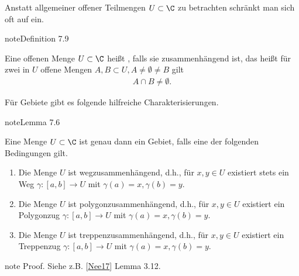 \documentclass[letterpaper,10pt,german]{jupyterBook}
\begin{document}
\sphinxAtStartPar
Anstatt allgemeiner offener Teilmengen \(U\subset\C\) zu betrachten schränkt man sich oft auf  ein.
\label{complexanalysis/kurvenintegrale:definition-13}
\begin{sphinxadmonition}{note}{Definition 7.9}



\sphinxAtStartPar
Eine offenen Menge \(U\subset\C\) heißt , falls sie zusammenhängend ist, das heißt für zwei in \(U\) offene Mengen \(A,B\subset U,A\neq\emptyset\neq B\) gilt
\begin{equation*}
\begin{split}A\cap B \neq \emptyset.\end{split}
\end{equation*}\end{sphinxadmonition}

\sphinxAtStartPar
Für Gebiete gibt es folgende hilfreiche Charakterisierungen.
\label{complexanalysis/kurvenintegrale:lemma-14}
\begin{sphinxadmonition}{note}{Lemma 7.6}



\sphinxAtStartPar
Eine Menge \(U\subset\C\) ist genau dann ein Gebiet, falls eine der folgenden Bedingungen gilt.
\begin{enumerate}
%
\item {} 
\sphinxAtStartPar
Die Menge \(U\) ist wegzusammenhängend, d.h., für \(x,y\in U\) existiert stets ein Weg \(\gamma:[a,b]\to U\) mit \(\gamma(a)=x,\gamma(b)=y\).

\item {} 
\sphinxAtStartPar
Die Menge \(U\) ist polygonzusammenhängend, d.h., für \(x,y\in U\) existiert ein Polygonzug \(\gamma:[a,b]\to U\) mit \(\gamma(a)=x,\gamma(b)=y\).

\item {} 
\sphinxAtStartPar
Die Menge \(U\) ist treppenzusammenhängend, d.h., für \(x,y\in U\) existiert ein Treppenzug \(\gamma:[a,b]\to U\) mit \(\gamma(a)=x,\gamma(b)=y\).

\end{enumerate}
\end{sphinxadmonition}

\begin{sphinxadmonition}{note}
\sphinxAtStartPar
Proof. Siehe z.B. {[}\hyperlink{cite.references:id13}{Nee17}{]} Lemma 3.12.
\end{sphinxadmonition}
\end{document}
